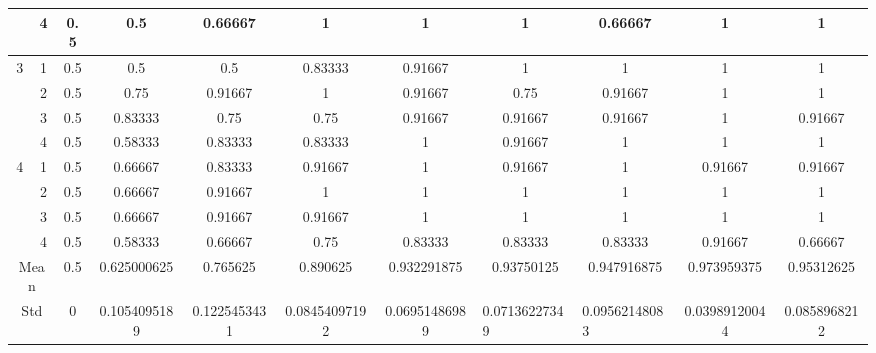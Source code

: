 \documentclass[draft,dvipsnames]{drexel-thesis}
\begin{document}
\begin{thesis}
\begin{table}[!t]
{\begin{tabular}{|c|c|c|c|c|c|c|c|c|c|c|}
                      & 4                   & 0.5 & 0.5          & 0.66667      & 1             & 1             & 1                                  & 0.66667                            & 1             & 1            \\ \hline
\multirow{4}{*}{3}    & 1                   & 0.5 & 0.5          & 0.5          & 0.83333       & 0.91667       & 1                                  & 1                                  & 1             & 1            \\ \cline{2-11} 
                      & 2                   & 0.5 & 0.75         & 0.91667      & 1             & 0.91667       & 0.75                               & 0.91667                            & 1             & 1            \\ \cline{2-11} 
                      & 3                   & 0.5 & 0.83333      & 0.75         & 0.75          & 0.91667       & 0.91667                            & 0.91667                            & 1             & 0.91667      \\ \cline{2-11} 
                      & 4                   & 0.5 & 0.58333      & 0.83333      & 0.83333       & 1             & 0.91667                            & 1                                  & 1             & 1            \\ \hline
\multirow{4}{*}{4}    & 1                   & 0.5 & 0.66667      & 0.83333      & 0.91667       & 1             & 0.91667                            & 1                                  & 0.91667       & 0.91667      \\ \cline{2-11} 
                      & 2                   & 0.5 & 0.66667      & 0.91667      & 1             & 1             & 1                                  & 1                                  & 1             & 1            \\ \cline{2-11} 
                      & 3                   & 0.5 & 0.66667      & 0.91667      & 0.91667       & 1             & 1                                  & 1                                  & 1             & 1            \\ \cline{2-11} 
                      & 4                   & 0.5 & 0.58333      & 0.66667      & 0.75          & 0.83333       & 0.83333                            & 0.83333                            & 0.91667       & 0.66667      \\ \hline
\multicolumn{2}{|c|}{Mean}                  & 0.5 & 0.625000625  & 0.765625     & 0.890625      & 0.932291875   & 0.93750125                         & 0.947916875                        & 0.973959375   & 0.95312625   \\ \hline
\multicolumn{2}{|c|}{Std}                   & 0   & 0.1054095189 & 0.1225453431 & 0.08454097192 & 0.06951486989 & \multicolumn{1}{l|}{0.07136227349} & \multicolumn{1}{l|}{0.09562148083} & 0.03989120044 & 0.0858968212 \\ \hline
\end{tabular}}
\end{table}


\end{thesis}
\end{document}
